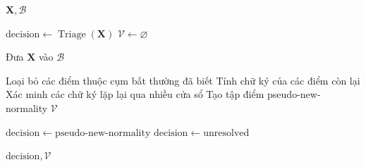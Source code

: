 \begin{algorithm}[H]
\caption{Phân luồng và xác thực pseudo-new-normality}
\label{alg:route-verify-pnn}
\begin{algorithmic}[1]









{$\mathbf{X},\mathcal{B}$}

    \State $\mathrm{decision}
    \gets \operatorname{Triage}(\mathbf{X})$
    \State $\mathcal{V} \gets \varnothing$

        \State Đưa $\mathbf{X}$ vào $\mathcal{B}$

            \State Loại bỏ các điểm thuộc cụm bất thường đã biết
            \State Tính chữ ký của các điểm còn lại
            \State Xác minh các chữ ký lặp lại qua nhiều cửa sổ
            \State Tạo tập điểm pseudo-new-normality $\mathcal{V}$

                \State $\mathrm{decision}
                \gets \mathrm{pseudo\text{-}new\text{-}normality}$
            \Else
                \State $\mathrm{decision}
                \gets \mathrm{unresolved}$
            \EndIf
        \EndIf
    \EndIf

    \State \Return $\mathrm{decision},\mathcal{V}$

\EndProcedure

\end{algorithmic}
\end{algorithm}

